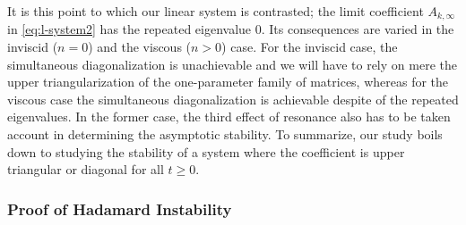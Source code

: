 \documentclass[a4paper,11pt]{article}
\theoremstyle{remark}
\begin{document}
It is this point to which our linear system is contrasted; the limit coefficient $A_{k,\infty}$ in \eqref{eq:l-system2} has the repeated eigenvalue $0$. Its consequences are varied in the inviscid ($n=0$) and the viscous ($n>0$) case. For the inviscid case, the simultaneous diagonalization is unachievable and we will have to rely on mere the upper triangularization of the one-parameter family of matrices, whereas for the viscous case the simultaneous diagonalization is achievable despite of the repeated eigenvalues. In the former case, the third effect of resonance also has to be taken account in determining the asymptotic stability. To summarize, our study boils down to studying the stability of a system where the coefficient is upper triangular or diagonal for all $t\ge0$.




\subsubsection{Proof of Hadamard Instability}
\end{document}
